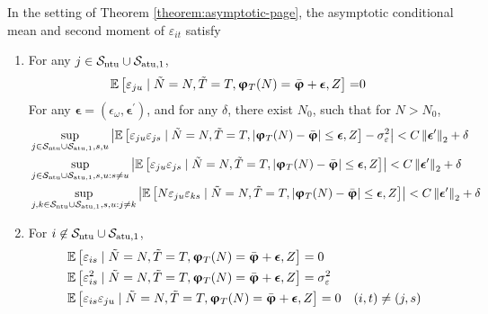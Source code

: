 \begin{lemma}\label{lemma:conditional-mean-variance}
In the setting of Theorem \ref{theorem:asymptotic-page}, 
the asymptotic conditional mean and second moment of $\varepsilon_{it}$ satisfy
\begin{enumerate}
    \item For any $j \in \mathcal{S}_{\mathrm{ntu}} \cup \mathcal{S}_{\mathrm{atu},1}$, 
\begin{align}
    \mathbb{E}\left[\varepsilon_{ju} \mid \tilde{N} = N, \tilde{T} = T, \bm{\upvarphi}_T(N) = \bar{\bm{\upvarphi}} + \bm{\epsilon}, Z \right]  =& 0 \label{eqn:lemma-7-3-1-1}
\end{align}
  For any $\bm{\epsilon} = (\epsilon_{\omega}, \bm{\epsilon}^\prime)$, and for any $\delta$, there exist $N_0$, such that for $N > N_0$,
  \begin{align}
  &\sup_{j \in \mathcal{S}_{\mathrm{ntu}} \cup \mathcal{S}_{\mathrm{atu},1}, s, u} \left|\mathbb{E}\left[\varepsilon_{ju} \varepsilon_{js}  \mid \tilde{N} = N, \tilde{T} = T, |\bm{\upvarphi}_T(N) - \bar{\bm{\upvarphi}}| \leq {\bm{\epsilon}}, Z \right] - \sigma_\varepsilon^2\right| < C \left\lVert\bm{\epsilon}^\prime\right\rVert_2 + \delta  \label{eqn:lemma-7-3-1-2} \\
 & \sup_{j \in \mathcal{S}_{\mathrm{ntu}} \cup \mathcal{S}_{\mathrm{atu},1}, s, u: s\neq u} \left|\mathbb{E}\left[\varepsilon_{ju} \varepsilon_{js}  \mid \tilde{N} = N, \tilde{T} = T, |\bm{\upvarphi}_T(N) - \bar{\bm{\upvarphi}}| \leq {\bm{\epsilon}}, Z \right] \right| < C \left\lVert\bm{\epsilon}^\prime\right\rVert_2 + \delta \label{eqn:lemma-7-3-1-3} \\
   &   \sup_{j,k \in \mathcal{S}_{\mathrm{ntu}} \cup \mathcal{S}_{\mathrm{atu},1}, s, u: j \neq k} \left|\mathbb{E}\left[N\varepsilon_{ju} \varepsilon_{ks}  \mid \tilde{N} = N, \tilde{T} = T, |\bm{\upvarphi}_T(N) - \bar{\bm{\upvarphi}}| \leq {\bm{\epsilon}}, Z \right] \right| < C \left\lVert\bm{\epsilon}^\prime\right\rVert_2 + \delta   \label{eqn:lemma-7-3-1-4}
  \end{align}
    \item For $i \not \in \mathcal{S}_{\mathrm{ntu}} \cup \mathcal{S}_{\mathrm{atu},1}$, 
    \begin{align}
        &\mathbb{E}\left[\varepsilon_{is} \mid \tilde{N} = N, \tilde{T} = T, \bm{\upvarphi}_T(N) = \bar{\bm{\upvarphi}} + \bm{\epsilon}, Z \right]  =  0 \label{eqn:lemma-7-3-2-1} \\
        &\mathbb{E}\left[\varepsilon^2_{is} \mid \tilde{N} = N, \tilde{T} = T, \bm{\upvarphi}_T(N) = \bar{\bm{\upvarphi}} + \bm{\epsilon}, Z \right]  = \sigma_\varepsilon^2 \label{eqn:lemma-7-3-2-2} \\
        &\mathbb{E}\left[\varepsilon_{is} \varepsilon_{ju}  \mid \tilde{N} = N, \tilde{T} = T, \bm{\upvarphi}_T(N) = \bar{\bm{\upvarphi}} + \bm{\epsilon}, Z \right]  = 0 & (i,t) \neq (j,s)\label{eqn:lemma-7-3-2-3}
    \end{align}
\end{enumerate}
\end{lemma}

